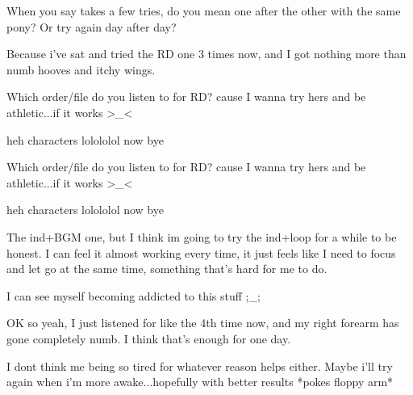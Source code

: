 \documentclass[ebook,12pt,oneside,openany]{memoir}
\newcommand{\mytexttilde}{\raisebox{0.5ex}{\texttildelow}}
\begin{document}
\begin{tcolorbox}[title=\mytexttilde{}Chaotic Parsley\mytexttilde{},colback=cyan!5!white,colframe=cyan!75!black,coltitle=white]
\begin{tcolorbox}[title=Creeping Dusk]
\par{When you say takes a few tries, do you mean one after the other with the same pony? Or try again day after day?}
\par{Because i've sat and tried the RD one 3 times now, and I got nothing more than numb hooves and itchy wings.  }
\end{tcolorbox}
\par{Which order/file do you listen to for RD? cause I wanna try hers and be athletic...if it works >\_<}
\newline{}
\par{heh characters lolololol now bye }
\end{tcolorbox}
\begin{tcolorbox}[title=Agent505,colback=pink!5!white,colframe=pink!75!black,coltitle=white]
\begin{tcolorbox}[title=Parsleyshy]
\par{Which order/file do you listen to for RD? cause I wanna try hers and be athletic...if it works >\_<}
\newline{}
\par{heh characters lolololol now bye }
\end{tcolorbox}
\par{The ind+BGM one, but I think im going to try the ind+loop for a while to be honest. I can feel it almost working every time, it just feels like I need to focus and let go at the same time, something that's hard for me to do.}
\newline{}
\par{\begin{tiny}I can see myself becoming addicted to this stuff ;\_;\end{tiny}}
\newline{}
\newline{}
\par{OK so yeah, I just listened for like the 4th time now, and my right forearm has gone completely numb. I think that's enough for one day. }
\par{I dont think me being so tired for whatever reason helps either. Maybe i'll try again when i'm more awake...hopefully with better results *pokes floppy arm*}
\end{tcolorbox}
\end{document}
